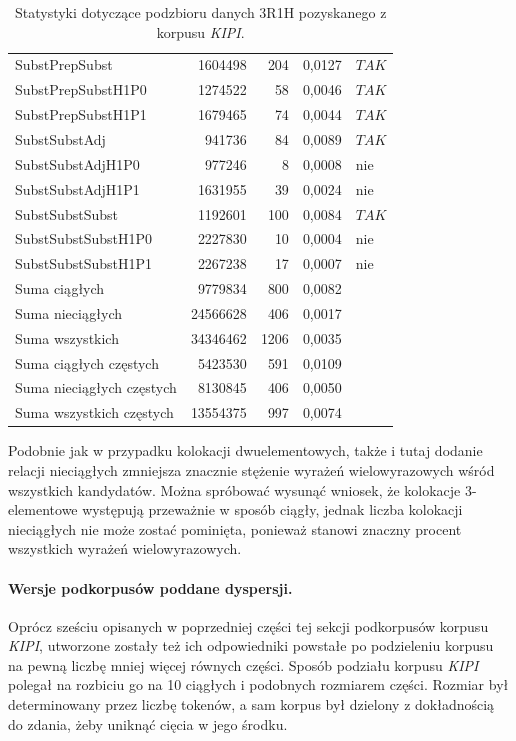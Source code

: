 \documentclass[11pt,a4paper]{llncs}
\begin{document}
\begin{table}[h!]
\begin{tabular}{ l | r | r | r | l }
	SubstPrepSubst	&	1604498	&	204	&	0,0127	&	$ TAK $	\\
	SubstPrepSubstH1P0	&	1274522	&	58	&	0,0046	&	$ TAK $	\\
	SubstPrepSubstH1P1	&	1679465	&	74	&	0,0044	&	$ TAK $	\\
	SubstSubstAdj	&	941736	&	84	&	0,0089	&	$ TAK $	\\
	SubstSubstAdjH1P0	&	977246	&	8	&	0,0008	&	nie	\\
	SubstSubstAdjH1P1	&	1631955	&	39	&	0,0024	&	nie	\\
	SubstSubstSubst	&	1192601	&	100	&	0,0084	&	$ TAK $	\\
	SubstSubstSubstH1P0	&	2227830	&	10	&	0,0004	&	nie	\\
	SubstSubstSubstH1P1	&	2267238	&	17	&	0,0007	&	nie	\\
	\midrule									
	Suma ciągłych	&	9779834	&	800	&	0,0082	&		\\
	Suma nieciągłych	&	24566628	&	406	&	0,0017	&		\\
	Suma wszystkich	&	34346462	&	1206	&	0,0035	&		\\
	Suma ciągłych częstych	&	5423530	&	591	&	0,0109	&		\\
	Suma nieciągłych częstych	&	8130845	&	406	&	0,0050	&		\\
	Suma wszystkich częstych	&	13554375	&	997	&	0,0074	&		\\
\bottomrule									
\end{tabular}
\caption[Statystyki podzbioru danych \emph{KIPI} 3R1H]{Statystyki dotyczące podzbioru danych 3R1H pozyskanego z korpusu \emph{KIPI}.}
\label{KIPI_3R1H_stats}
\end{table}

Podobnie jak w przypadku kolokacji dwuelementowych, także i tutaj dodanie relacji nieciągłych zmniejsza znacznie stężenie wyrażeń wielowyrazowych wśród wszystkich kandydatów.
Można spróbować wysunąć wniosek, że kolokacje 3-elementowe występują przeważnie w sposób ciągły, jednak liczba kolokacji nieciągłych nie może zostać pominięta, ponieważ stanowi znaczny procent wszystkich wyrażeń wielowyrazowych.


\paragraph{Wersje podkorpusów poddane dyspersji.}
Oprócz sześciu opisanych w poprzedniej części tej sekcji podkorpusów korpusu \emph{KIPI}, utworzone zostały też ich odpowiedniki powstałe po podzieleniu korpusu na pewną liczbę mniej więcej równych części.
Sposób podziału korpusu \emph{KIPI} polegał na rozbiciu go na 10 ciągłych i podobnych rozmiarem części.
Rozmiar był determinowany przez liczbę tokenów, a sam korpus był dzielony z dokładnością do zdania, żeby uniknąć cięcia w jego środku.
\end{document}
